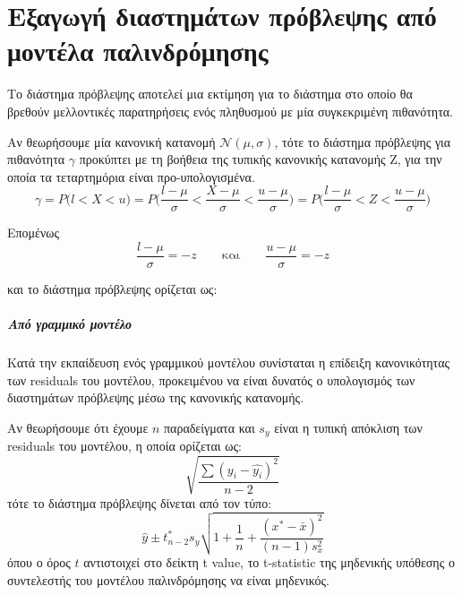 \chapter{Εξαγωγή διαστημάτων πρόβλεψης από μοντέλα παλινδρόμησης}
\label{appendix:Intervals}

Το διάστημα πρόβλεψης αποτελεί μια εκτίμηση για το διάστημα στο οποίο θα βρεθούν μελλοντικές παρατηρήσεις ενός πληθυσμού με μία συγκεκριμένη πιθανότητα.

Αν θεωρήσουμε μία κανονική κατανομή  $\mathcal{N} (\mu, \sigma)$, τότε το διάστημα πρόβλεψης για πιθανότητα $\gamma$ προκύπτει με τη βοήθεια της τυπικής κανονικής κατανομής Z, για την οποία τα τεταρτημόρια είναι προ-υπολογισμένα.
\begin{equation}
\gamma = P\big(l < X < u\big) = P\Bigg(\frac{l-\mu}{\sigma} < \frac{X-\mu}{\sigma} < \frac{u-\mu}{\sigma}\Bigg)= P\Bigg(\frac{l-\mu}{\sigma} < Z < \frac{u-\mu}{\sigma}\Bigg)
\end{equation}

Επομένως
\begin{equation}
\frac{l-\mu}{\sigma} = -z \qquad\text{και}\qquad \frac{u-\mu}{\sigma} = -z
\end{equation}

και το διάστημα πρόβλεψης ορίζεται ως:
\begin{equation}
	[\mu - z \sigma, \mu + z \sigma ]
\end{equation}

\paragraph{Από γραμμικό μοντέλο}
Κατά την εκπαίδευση ενός γραμμικού μοντέλου συνίσταται η επίδειξη κανονικότητας των residuals του μοντέλου, προκειμένου να είναι δυνατός ο υπολογισμός των διαστημάτων πρόβλεψης μέσω της κανονικής κατανομής.

Αν θεωρήσουμε ότι έχουμε $n$ παραδείγματα και $s_y$ είναι η τυπική απόκλιση των residuals του μοντέλου, η οποία ορίζεται ως:
\begin{equation}
\sqrt{\frac{\sum(y_i - \hat{y_i})^2}{n-2}}
\end{equation}
τότε το διάστημα πρόβλεψης δίνεται από τον τύπο:
\begin{equation}
\hat{y}\pm t^*_{n-2} s_y \sqrt{1 + \frac{1}{n} + \frac{(x^* - \bar{x})^2}{(n-1) s_x^2}}
\end{equation}
όπου ο όρος $t$ αντιστοιχεί στο δείκτη t value, το t-statistic της μηδενικής υπόθεσης ο συντελεστής του μοντέλου παλινδρόμησης να είναι μηδενικός.   

